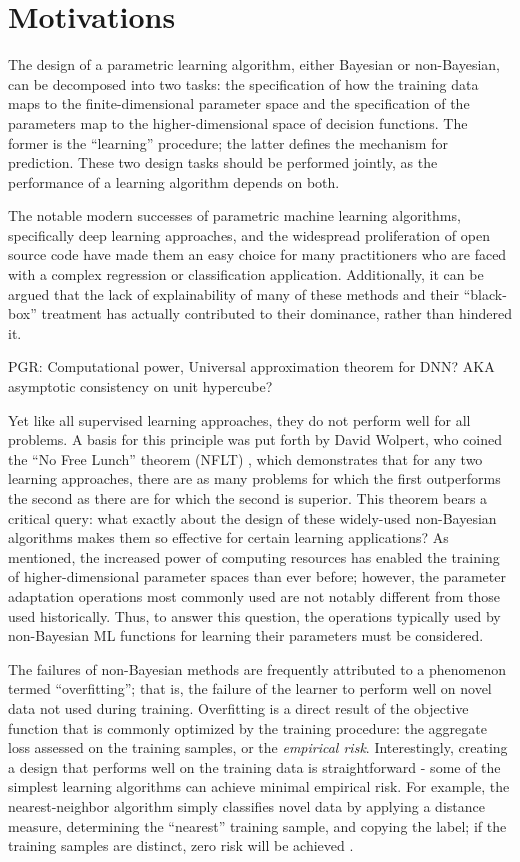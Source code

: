 \documentclass[12pt]{article}
\begin{document}
\newpage
\section{Motivations} \label{sec:motivation}

The design of a parametric learning algorithm, either Bayesian or non-Bayesian, can be decomposed into two tasks: the specification of how the training data maps to the finite-dimensional parameter space and the specification of the parameters map to the higher-dimensional space of decision functions. The former is the ``learning'' procedure; the latter defines the mechanism for prediction. These two design tasks should be performed jointly, as the performance of a learning algorithm depends on both. 


The notable modern successes of parametric machine learning algorithms, specifically deep learning approaches, and the widespread proliferation of open source code \cite{tensorflow} have made them an easy choice for many practitioners who are faced with a complex regression or classification application. Additionally, it can be argued that the lack of explainability of many of these methods and their ``black-box'' treatment has actually contributed to their dominance, rather than hindered it. 

PGR: Computational power, Universal approximation theorem for DNN? AKA asymptotic consistency on unit hypercube?

Yet like all supervised learning approaches, they do not perform well for all problems. A basis for this principle was put forth by David Wolpert, who coined the ``No Free Lunch'' theorem (NFLT) \cite{wolpert}, which demonstrates that for any two learning approaches, there are as many problems for which the first outperforms the second as there are for which the second is superior. This theorem bears a critical query: what exactly about the design of these widely-used non-Bayesian algorithms makes them so effective for certain learning applications? As mentioned, the increased power of computing resources has enabled the training of higher-dimensional parameter spaces than ever before; however, the parameter adaptation operations most commonly used are not notably different from those used historically. Thus, to answer this question, the operations typically used by non-Bayesian ML functions for learning their parameters must be considered.

The failures of non-Bayesian methods are frequently attributed to a phenomenon termed ``overfitting''; that is, the failure of the learner to perform well on novel data not used during training. Overfitting is a direct result of the objective function that is commonly optimized by the training procedure: the aggregate loss assessed on the training samples, or the \emph{empirical risk}. Interestingly, creating a design that performs well on the training data is straightforward - some of the simplest learning algorithms can achieve minimal empirical risk. For example, the nearest-neighbor algorithm simply classifies novel data by applying a distance measure, determining the ``nearest'' training sample, and copying the label; if the training samples are distinct, zero risk will be achieved \cite{devroye}. 
\end{document}
